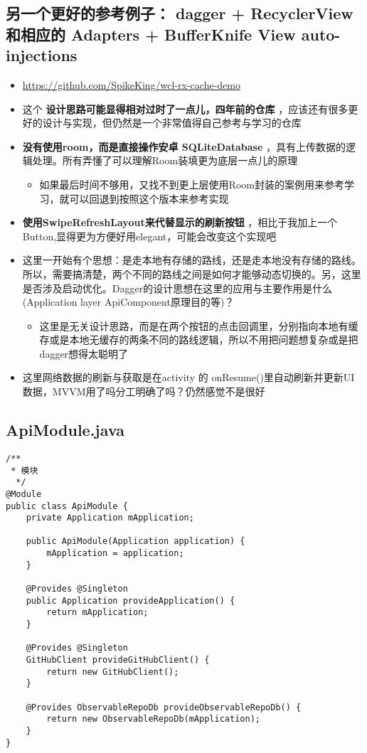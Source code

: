 \documentclass[9pt, b5paper]{article}
\begin{document}
\subsection{另一个更好的参考例子： dagger + RecyclerView 和相应的 Adapters + BufferKnife View auto-injections}
\label{sec-3-1}
\begin{itemize}
\item \url{https://github.com/SpikeKing/wcl-rx-cache-demo}
\item 这个 \textbf{设计思路可能显得相对过时了一点儿，四年前的仓库} ，应该还有很多更好的设计与实现，但仍然是一个非常值得自己参考与学习的仓库
\item \textbf{没有使用room，而是直接操作安卓 SQLiteDatabase} ，具有上传数据的逻辑处理。所有弄懂了可以理解Room装填更为底层一点儿的原理
\begin{itemize}
\item 如果最后时间不够用，又找不到更上层使用Room封装的案例用来参考学习，就可以回退到按照这个版本来参考实现
\end{itemize}
\item \textbf{使用SwipeRefreshLayout来代替显示的刷新按钮} ，相比于我加上一个Button,显得更为方便好用elegant，可能会改变这个实现吧
\item 这里一开始有个思想：是走本地有存储的路线，还是走本地没有存储的路线。所以，需要搞清楚，两个不同的路线之间是如何才能够动态切换的。另，这里是否涉及启动优化。Dagger的设计思想在这里的应用与主要作用是什么(Application layer ApiComponent原理目的等)？
\begin{itemize}
\item 这里是无关设计思路，而是在两个按钮的点击回调里，分别指向本地有缓存或是本地无缓存的两条不同的路线逻辑，所以不用把问题想复杂或是把dagger想得太聪明了
\end{itemize}
\item 这里网络数据的刷新与获取是在activity 的 onResume()里自动刷新并更新UI数据，MVVM用了吗分工明确了吗？仍然感觉不是很好
\end{itemize}
\subsection{ApiModule.java}
\label{sec-3-2}
\begin{verbatim}
/**
 * 模块
  */
@Module
public class ApiModule {
    private Application mApplication;

    public ApiModule(Application application) {
        mApplication = application;
    }

    @Provides @Singleton
    public Application provideApplication() {
        return mApplication;
    }

    @Provides @Singleton
    GitHubClient provideGitHubClient() {
        return new GitHubClient();
    }

    @Provides ObservableRepoDb provideObservableRepoDb() {
        return new ObservableRepoDb(mApplication);
    }
}
\end{verbatim}
\end{document}
